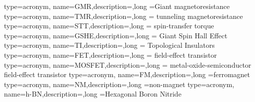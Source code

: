 {type=acronym, name={GMR},description={},long ={Giant magnetoresistance}
}
{type=acronym, name={TMR},description={},long ={ tunneling magnetoresistance}
}
{type=acronym, name={STT},description={},long ={ spin-transfer torque}
}
{type=acronym, name={GSHE},description={},long ={  Giant Spin Hall Effect}
}
{type=acronym, name={TI},description={},long ={  Topological Insulators}
}
{type=acronym, name={FET},description={},long ={  field-effect transistor}
}
{type=acronym, name={MOSFET},description={},long ={  metal-oxide-semiconductor field-effect transistor}
}
{type=acronym, name={FM},description={},long ={ferromagnet}
}
{type=acronym, name={NM},description={},long ={non-magnet}
}
{type=acronym, name={h-BN},description={},long ={Hexagonal Boron Nitride}
}

